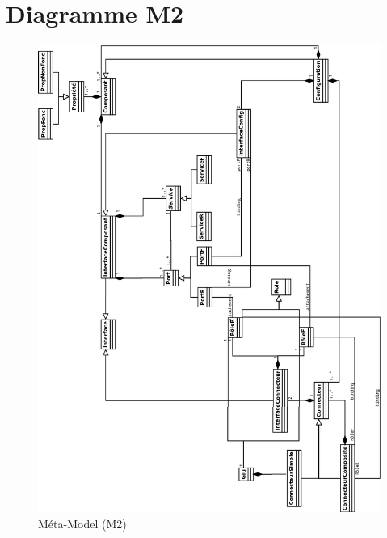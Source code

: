 \section{Diagramme M2}
\pagestyle{empty}
\begin{figure}[htb]
  \includegraphics[scale=0.33]{img/M2}
  \caption{Méta-Model (M2)}
  \label{fig:M2}
\end{figure}
